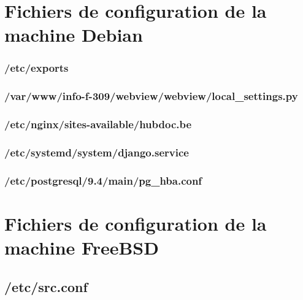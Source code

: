 \documentclass[10pt,a4paper]{article}
\begin{document}
\newpage
\begin{appendices}
  \section{Fichiers de configuration de la machine Debian}
  \subsubsection{/etc/exports}
  \label{subs:etc-exports}
  

  \subsubsection{/var/www/info-f-309/webview/webview/local\_settings.py}
  \label{subs:deb-webview-local-settings}
  

  \subsubsection{/etc/nginx/sites-available/hubdoc.be}
  \label{subs:deb-nginx-sites-avail-hubdoc}
  

  \subsubsection{/etc/systemd/system/django.service}
  \label{subs:deb-django-service}
  

  \subsubsection{/etc/postgresql/9.4/main/pg\_hba.conf}
  \label{subs:deb-pg-hba}
  

  \section{Fichiers de configuration de la machine FreeBSD}

  \subsection{/etc/src.conf}
  \label{sub:etc-src-conf}
  


\end{appendices}
\end{document}
